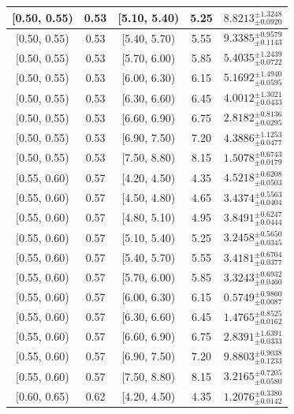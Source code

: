 \begin{longtable}{|c|c|c|c|c|}
\hline
[0.50, 0.55) & 0.53 & [5.10, 5.40) & 5.25 & $8.8213^{ \pm 1.3248 }_{ \pm 0.0920 }$ \\ 
\hline
[0.50, 0.55) & 0.53 & [5.40, 5.70) & 5.55 & $9.3385^{ \pm 0.9579 }_{ \pm 0.1143 }$ \\ 
\hline
[0.50, 0.55) & 0.53 & [5.70, 6.00) & 5.85 & $5.4035^{ \pm 1.2439 }_{ \pm 0.0722 }$ \\ 
\hline
[0.50, 0.55) & 0.53 & [6.00, 6.30) & 6.15 & $5.1692^{ \pm 1.4940 }_{ \pm 0.0595 }$ \\ 
\hline
[0.50, 0.55) & 0.53 & [6.30, 6.60) & 6.45 & $4.0012^{ \pm 1.3021 }_{ \pm 0.0433 }$ \\ 
\hline
[0.50, 0.55) & 0.53 & [6.60, 6.90) & 6.75 & $2.8182^{ \pm 0.8136 }_{ \pm 0.0295 }$ \\ 
\hline
[0.50, 0.55) & 0.53 & [6.90, 7.50) & 7.20 & $4.3886^{ \pm 1.1253 }_{ \pm 0.0477 }$ \\ 
\hline
[0.50, 0.55) & 0.53 & [7.50, 8.80) & 8.15 & $1.5078^{ \pm 0.6743 }_{ \pm 0.0179 }$ \\ 
\hline
[0.55, 0.60) & 0.57 & [4.20, 4.50) & 4.35 & $4.5218^{ \pm 0.6208 }_{ \pm 0.0503 }$ \\ 
\hline
[0.55, 0.60) & 0.57 & [4.50, 4.80) & 4.65 & $3.4374^{ \pm 0.5563 }_{ \pm 0.0404 }$ \\ 
\hline
[0.55, 0.60) & 0.57 & [4.80, 5.10) & 4.95 & $3.8491^{ \pm 0.6247 }_{ \pm 0.0444 }$ \\ 
\hline
[0.55, 0.60) & 0.57 & [5.10, 5.40) & 5.25 & $3.2458^{ \pm 0.5650 }_{ \pm 0.0345 }$ \\ 
\hline
[0.55, 0.60) & 0.57 & [5.40, 5.70) & 5.55 & $3.4181^{ \pm 0.6704 }_{ \pm 0.0377 }$ \\ 
\hline
[0.55, 0.60) & 0.57 & [5.70, 6.00) & 5.85 & $3.3243^{ \pm 0.6932 }_{ \pm 0.0460 }$ \\ 
\hline
[0.55, 0.60) & 0.57 & [6.00, 6.30) & 6.15 & $0.5749^{ \pm 0.9860 }_{ \pm 0.0087 }$ \\ 
\hline
[0.55, 0.60) & 0.57 & [6.30, 6.60) & 6.45 & $1.4765^{ \pm 0.8525 }_{ \pm 0.0162 }$ \\ 
\hline
[0.55, 0.60) & 0.57 & [6.60, 6.90) & 6.75 & $2.8391^{ \pm 1.6391 }_{ \pm 0.0333 }$ \\ 
\hline
[0.55, 0.60) & 0.57 & [6.90, 7.50) & 7.20 & $9.8803^{ \pm 0.9038 }_{ \pm 0.1233 }$ \\ 
\hline
[0.55, 0.60) & 0.57 & [7.50, 8.80) & 8.15 & $3.2165^{ \pm 0.7205 }_{ \pm 0.0580 }$ \\ 
\hline
[0.60, 0.65) & 0.62 & [4.20, 4.50) & 4.35 & $1.2076^{ \pm 0.3380 }_{ \pm 0.0142 }$ \\ 

\end{longtable}
